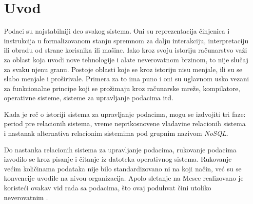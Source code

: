 \documentclass[12pt,oneside]{memoir}
\begin{document}
\frontmatter
\naslovna
\komisija
\apstrakt
\tableofcontents*

\mainmatter

\chapter{Uvod}

Podaci su najstabilniji deo svakog sistema. Oni su reprezentacija činjenica i instrukcija u formalizovanom stanju spremnom za dalju interakciju, interpretaciju ili obradu od strane korisnika ili mašine. Iako kroz svoju istoriju računarstvo važi za oblast koja uvodi nove tehnologije i alate neverovatnom brzinom, to nije slučaj za svaku njenu granu. Postoje oblasti koje se kroz istoriju nisu menjale, ili su se slabo menjale i proširivale. Primera za to ima puno i oni su uglavnom usko vezani za funkcionalne principe koji se prožimaju kroz računarske mreže, kompilatore, operativne sisteme, sisteme za upravljanje podacima itd. 

Kada je reč o istoriji sistema za upravljanje podacima, mogu se izdvojiti tri faze: period pre relacionih sistema, vreme neprikosnovene vladavine relacionih sistema i nastanak alternativa relacionim sistemima pod grupnim nazivom \textit{NoSQL}.

Do nastanka relacionih sistema za upravljanje podacima, rukovanje podacima izvodilo se kroz pisanje i čitanje iz datoteka operativnog sistema. Rukovanje većim količinama podataka nije bilo standardizovano ni na koji način, već su se konvencije uvodile na nivou organizacija. Apolo sletanje na Mesec realizovano je koristeći ovakav vid rada sa podacima, što ovaj poduhvat čini utoliko neverovatnim \cite{ColumnarOriented}. 
\end{document}
